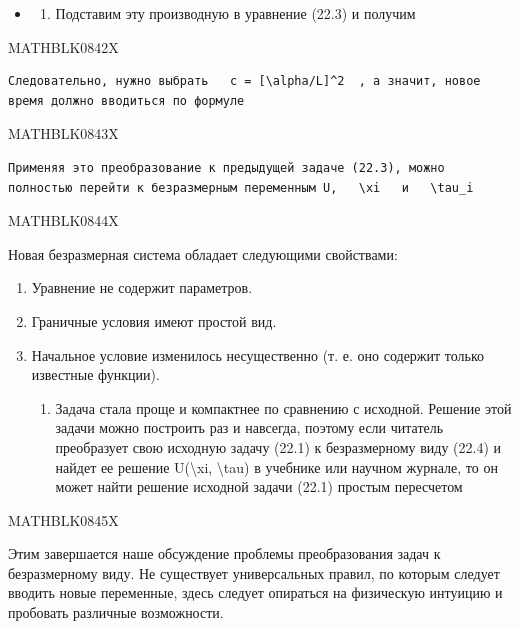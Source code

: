\documentclass[
]{article}
\providecommand{\tightlist}{%
  \setlength{\itemsep}{0pt}\setlength{\parskip}{0pt}}
\begin{document}
\begin{itemize}
\tightlist
\item
  \begin{enumerate}
  \def\labelenumi{\arabic{enumi}.}
  \setcounter{enumi}{2}
  \tightlist
  \item
    Подставим эту производную в уравнение (22.3) и получим
  \end{enumerate}
\end{itemize}

MATHBLK0842X

\begin{verbatim}
Следовательно, нужно выбрать   c = [\alpha/L]^2  , а значит, новое время должно вводиться по формуле
\end{verbatim}

MATHBLK0843X

\begin{verbatim}
Применяя это преобразование к предыдущей задаче (22.3), можно полностью перейти к безразмерным переменным U,   \xi   и   \tau_i
\end{verbatim}

MATHBLK0844X

Новая безразмерная система обладает следующими свойствами:

\begin{enumerate}
\def\labelenumi{\arabic{enumi}.}
\item
  Уравнение не содержит параметров.
\item
  Граничные условия имеют простой вид.
\item
  Начальное условие изменилось несущественно (т. е. оно содержит только
  известные функции).

  \begin{enumerate}
  \def\labelenumii{\arabic{enumii}.}
  \setcounter{enumii}{3}
  \tightlist
  \item
    Задача стала проще и компактнее по сравнению с исходной. Решение
    этой задачи можно построить раз и навсегда, поэтому если читатель
    преобразует свою исходную задачу (22.1) к безразмерному виду (22.4)
    и найдет ее решение U(\textbackslash xi, \textbackslash tau) в
    учебнике или научном журнале, то он может найти решение исходной
    задачи (22.1) простым пересчетом
  \end{enumerate}
\end{enumerate}

MATHBLK0845X

Этим завершается наше обсуждение проблемы преобразования задач к
безразмерному виду. Не существует универсальных правил, по которым
следует вводить новые переменные, здесь следует опираться на физическую
интуицию и пробовать различные возможности.
\end{document}
